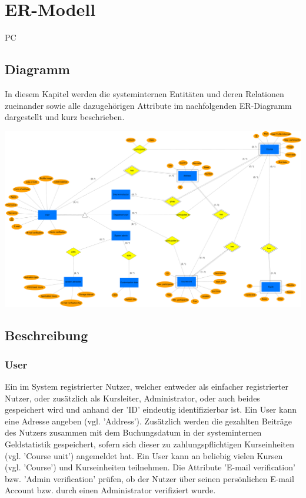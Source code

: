 \chapter{ER-Modell}

\begin{tiny}
PC
\end{tiny}

\section{Diagramm}

In diesem Kapitel werden die systeminternen Entitäten und deren Relationen zueinander sowie alle dazugehörigen Attribute im nachfolgenden ER-Diagramm dargestellt und kurz beschrieben.

\includegraphics[scale=0.085]{./Grafiken/ER-Diagramm.pdf}

\section{Beschreibung}
\subsection{User}
Ein im System registrierter Nutzer, welcher entweder als einfacher registrierter Nutzer, oder zusätzlich als Kursleiter, Administrator, oder auch beides gespeichert wird und anhand der 'ID' eindeutig identifizierbar ist. Ein User kann eine Adresse angeben (vgl. 'Address'). Zusätzlich werden die gezahlten Beiträge des Nutzers zusammen mit dem Buchungsdatum in der systeminternen Geldstatistik gespeichert, sofern sich dieser zu zahlungspflichtigen Kurseinheiten (vgl. 'Course unit') angemeldet hat. Ein User kann an beliebig vielen Kursen (vgl. 'Course') und Kurseinheiten teilnehmen. Die Attribute 'E-mail verification' bzw. 'Admin verification' prüfen, ob der Nutzer über seinen persönlichen E-mail Account bzw. durch einen Administrator verifiziert wurde.


